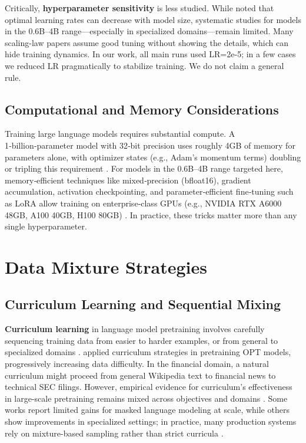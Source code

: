 Critically, \textbf{hyperparameter sensitivity} is less studied. While \textcite{mccandlish2018empirical} noted that optimal learning rates can decrease with model size, systematic studies for models in the 0.6B–4B range—especially in specialized domains—remain limited. Many scaling-law papers assume good tuning without showing the details, which can hide training dynamics. In our work, all main runs used LR=2e-5; in a few cases we reduced LR pragmatically to stabilize training. We do not claim a general rule.

\subsection{Computational and Memory Considerations}

Training large language models requires substantial compute. A 1‑billion‑parameter model with 32‑bit precision uses roughly 4GB of memory for parameters alone, with optimizer states (e.g., Adam's momentum terms) doubling or tripling this requirement \parencite{rajbhandari2020zero,kingma2014adam}. For models in the 0.6B–4B range targeted here, memory‑efficient techniques like mixed‑precision (bfloat16), gradient accumulation, activation checkpointing, and parameter‑efficient fine‑tuning such as LoRA allow training on enterprise‑class GPUs (e.g., NVIDIA RTX A6000 48GB, A100 40GB, H100 80GB) \parencite{narayanan2021efficient,hu2021lora}. In practice, these tricks matter more than any single hyperparameter.

\section{Data Mixture Strategies}

\subsection{Curriculum Learning and Sequential Mixing}

\textbf{Curriculum learning} in language model pretraining involves carefully sequencing training data from easier to harder examples, or from general to specialized domains \parencite{bengio2009curriculum}. \textcite{wu2022opt} applied curriculum strategies in pretraining OPT models, progressively increasing data difficulty. In the financial domain, a natural curriculum might proceed from general Wikipedia text to financial news to technical SEC filings. However, empirical evidence for curriculum's effectiveness in large-scale pretraining remains mixed across objectives and domains \parencite{longpre2023pretrainer}. Some works report limited gains for masked language modeling at scale, while others show improvements in specialized settings; in practice, many production systems rely on mixture-based sampling rather than strict curricula \parencite{raffel2020exploring,wu2022opt}.

